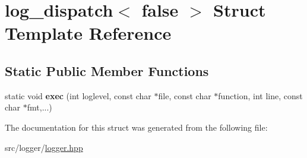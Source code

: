 \hypertarget{structlog__dispatch_3_01false_01_4}{\section{log\-\_\-dispatch$<$ false $>$ Struct Template Reference}
\label{structlog__dispatch_3_01false_01_4}
}
\subsection*{Static Public Member Functions}
\begin{DoxyCompactItemize}
\item 
\hypertarget{structlog__dispatch_3_01false_01_4_a42d2eba1bbcdac86e2159c24635eb47a}{static void {\bfseries exec} (int loglevel, const char $\ast$file, const char $\ast$function, int line, const char $\ast$fmt,...)}\label{structlog__dispatch_3_01false_01_4_a42d2eba1bbcdac86e2159c24635eb47a}

\end{DoxyCompactItemize}


The documentation for this struct was generated from the following file\-:\begin{DoxyCompactItemize}
\item 
src/logger/\hyperlink{logger_8hpp}{logger.\-hpp}\end{DoxyCompactItemize}
